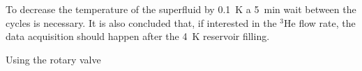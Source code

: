 To decrease the temperature of the superfluid by 0.1~K a 5~min wait
between the cycles is necessary. It is also concluded that, if
interested in the $^3$He flow rate, the data acquisition should happen
after the 4~K reservoir filling.





Using the rotary valve




  
  
  
